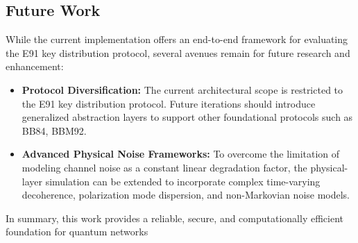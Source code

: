 \subsection{Future Work}
While the current implementation offers an end-to-end framework for evaluating the E91 key distribution protocol, several avenues remain for future research and enhancement:
\begin{itemize}
    \item \textbf{Protocol Diversification:} The current architectural scope is restricted to the E91 key distribution protocol. Future iterations should introduce generalized abstraction layers to support other foundational protocols such as BB84, BBM92.
    \item \textbf{Advanced Physical Noise Frameworks:} To overcome the limitation of modeling channel noise as a constant linear degradation factor, the physical-layer simulation can be extended to incorporate complex time-varying decoherence, polarization mode dispersion, and non-Markovian noise models.
\end{itemize}

In summary, this work provides a reliable, secure, and computationally efficient foundation for quantum networks
